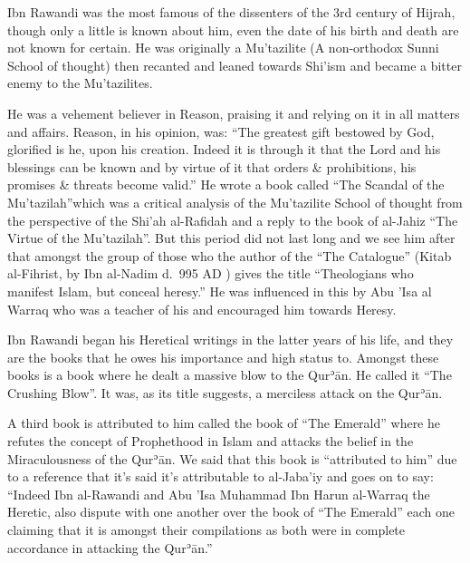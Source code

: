 \documentclass[12pt]{book}
\def \Quran{Qurʾān} %
\begin{document}
Ibn Rawandi was the most famous of the dissenters of the 3rd century of Hijrah,
though only a little is known about him, even the date of his birth and death
are not known for certain. He was originally a Mu’tazilite (A non-orthodox
Sunni School of thought) then recanted and leaned towards Shi’ism and became
a bitter enemy to the Mu’tazilites.

He was a vehement believer in Reason, praising it and relying on it in all
matters and affairs. Reason, in his opinion, was: “The greatest gift bestowed
by God, glorified is he, upon his creation. Indeed it is through it that the
Lord and his blessings can be known and by virtue of it that orders \&
prohibitions, his promises \& threats become valid.”\footnotemark
He wrote a book called “The Scandal of the Mu’tazilah”\footnotemark which was a
critical analysis of the Mu’tazilite School of thought from the perspective of
the Shi’ah al-Rafidah and a reply to the book of al-Jahiz “The Virtue of the
Mu’tazilah”. But this period did not last long and we see him after that
amongst the group of those who the author of the “The Catalogue” (Kitab
al-Fihrist, by Ibn al-Nadim d.\ 995 AD ) gives the title “Theologians who
manifest Islam, but conceal heresy.” He was influenced in this by Abu ’Isa al
Warraq who was a teacher of his and encouraged him towards Heresy.


Ibn Rawandi began his Heretical writings in the latter years of his life, and
they are the books that he owes his importance and high status to. Amongst
these books is a book where he dealt a massive blow to the \Quran. He called it
“The Crushing Blow”. It was, as its title suggests, a merciless attack on the
\Quran.

A third book is attributed to him called the book of “The Emerald” where he
refutes the concept of Prophethood in Islam and attacks the belief in the
Miraculousness of the \Quran. We said that this book is “attributed to him” due
to a reference that it’s said it’s attributable to al-Jaba’iy and goes on to
say: “Indeed Ibn al-Rawandi and Abu ’Isa Muhammad Ibn Harun al-Warraq the
Heretic, also dispute with one another over the book of “The Emerald” each one
claiming that it is amongst their compilations as both were in complete
accordance in attacking the \Quran.”\footnotemark
\end{document}
